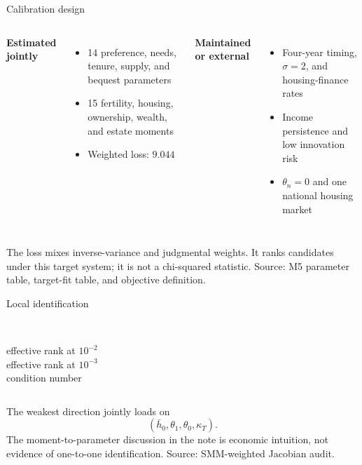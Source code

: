 \documentclass[aspectratio=169,11pt]{beamer}
\newcommand{\source}[1]{\vfill{\color{Muted}\tiny Source: #1}}
\newcommand{\bad}[1]{{\color{Terra}\textbf{#1}}}
\newcommand{\tightitems}{\setlength{\itemsep}{0.55em}}
\begin{document}
\begin{frame}{Calibration design}
  \begin{columns}[T,onlytextwidth]
      \large\textbf{Estimated jointly}
      \begin{itemize}\tightitems
        \item 14 preference, needs, tenure, supply, and bequest parameters
        \item 15 fertility, housing, ownership, wealth, and estate moments
        \item Weighted loss: $9.044$
      \end{itemize}
      \large\textbf{Maintained or external}
      \begin{itemize}\tightitems
        \item Four-year timing, $\sigma=2$, and housing-finance rates
        \item Income persistence and low innovation risk
        \item $\theta_n=0$ and one national housing market
      \end{itemize}
  \end{columns}

  \vspace{0.8em}
  \alert{The loss mixes inverse-variance and judgmental weights.} It ranks candidates under this target system; it is not a chi-squared statistic.
  \source{M5 parameter table, target-fit table, and objective definition.}
\end{frame}

\begin{frame}{Local identification}
  \begin{columns}[T,onlytextwidth]
      {\fontsize{34}{38}\selectfont\bad{9 / 14}}\\
      \large effective rank at $10^{-2}$
      {\fontsize{34}{38}\selectfont\bad{12 / 14}}\\
      \large effective rank at $10^{-3}$
      {\fontsize{34}{38}\selectfont\bad{2,926}}\\
      \large condition number
  \end{columns}

  \vspace{1.2em}
  The weakest direction jointly loads on
  \[
    (\bar h_0,\theta_1,\theta_0,\kappa_T).
  \]
  The moment-to-parameter discussion in the note is economic intuition, not evidence of one-to-one identification.
  \source{SMM-weighted Jacobian audit.}
\end{frame}
\end{document}
